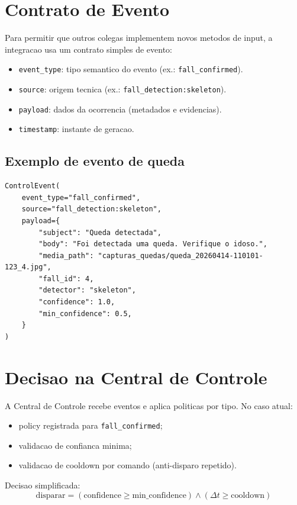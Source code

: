 \documentclass[12pt,a4paper]{article}
\begin{document}
\section{Contrato de Evento}
Para permitir que outros colegas implementem novos metodos de input, a integracao usa um contrato simples de evento:

\begin{itemize}
    \item \texttt{event\_type}: tipo semantico do evento (ex.: \texttt{fall\_confirmed}).
    \item \texttt{source}: origem tecnica (ex.: \texttt{fall\_detection:skeleton}).
    \item \texttt{payload}: dados da ocorrencia (metadados e evidencias).
    \item \texttt{timestamp}: instante de geracao.
\end{itemize}

\subsection*{Exemplo de evento de queda}
\begin{lstlisting}[style=py]
ControlEvent(
    event_type="fall_confirmed",
    source="fall_detection:skeleton",
    payload={
        "subject": "Queda detectada",
        "body": "Foi detectada uma queda. Verifique o idoso.",
        "media_path": "capturas_quedas/queda_20260414-110101-123_4.jpg",
        "fall_id": 4,
        "detector": "skeleton",
        "confidence": 1.0,
        "min_confidence": 0.5,
    }
)
\end{lstlisting}

\section{Decisao na Central de Controle}
A Central de Controle recebe eventos e aplica politicas por tipo. No caso atual:

\begin{itemize}
    \item policy registrada para \texttt{fall\_confirmed};
    \item validacao de confianca minima;
    \item validacao de cooldown por comando (anti-disparo repetido).
\end{itemize}

Decisao simplificada:
\[
\text{disparar} = (\text{confidence} \ge \text{min\_confidence}) \land (\Delta t \ge \text{cooldown})
\]
\end{document}
